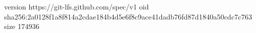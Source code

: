 version https://git-lfs.github.com/spec/v1
oid sha256:2a0128f1a8f814a2cdae184b4d5e6f8c9ace41dadb76fd87d1840a50cdc7c763
size 174936
